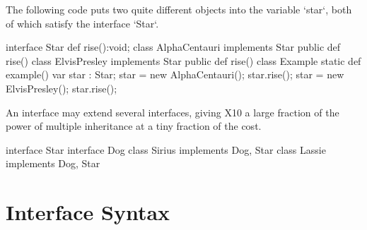 \begin{ex}
The following code puts two quite different objects into the variable
\xcd`star`, both of which satisfy the interface \xcd`Star`.
\begin{xten}
interface Star { def rise():void; }
class AlphaCentauri implements Star {
   public def rise() {}
}
class ElvisPresley implements Star {
   public def rise() {}
}
class Example {
   static def example() {
      var star : Star;
      star = new AlphaCentauri();
      star.rise();
      star = new ElvisPresley();
      star.rise();
   }
}
\end{xten}
%
\end{ex}
An interface may extend several interfaces, giving
X10 a large fraction of the power of multiple inheritance at a tiny fraction
of the cost.

\begin{ex}
\begin{xten}
interface Star{}
interface Dog{}
class Sirius implements Dog, Star{}
class Lassie implements Dog, Star{}
\end{xten}
%
\end{ex}


\section{Interface Syntax}

\label{DepType:Interface}

